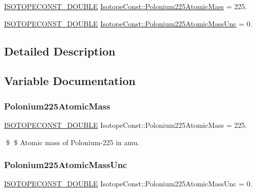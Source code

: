 \begin{DoxyCompactItemize}
\item 
\mbox{\hyperlink{group___isotope_const-_macros_ga8f45a7272ce02c0b4c65c44636ed719a}{I\+S\+O\+T\+O\+P\+E\+C\+O\+N\+S\+T\+\_\+\+D\+O\+U\+B\+LE}} \mbox{\hyperlink{group___isotope_const-_polonium-_po225_gaeb73050d9148f5de2b541ce38e450e15}{Isotope\+Const\+::\+Polonium225\+Atomic\+Mass}} = 225.
\item 
\mbox{\hyperlink{group___isotope_const-_macros_ga8f45a7272ce02c0b4c65c44636ed719a}{I\+S\+O\+T\+O\+P\+E\+C\+O\+N\+S\+T\+\_\+\+D\+O\+U\+B\+LE}} \mbox{\hyperlink{group___isotope_const-_polonium-_po225_ga4332cfda6e1617f4508d37139809e81b}{Isotope\+Const\+::\+Polonium225\+Atomic\+Mass\+Unc}} = 0.
\end{DoxyCompactItemize}


\subsection{Detailed Description}


\subsection{Variable Documentation}
\mbox{\label{group___isotope_const-_polonium-_po225_gaeb73050d9148f5de2b541ce38e450e15}} 
\subsubsection{\texorpdfstring{Polonium225\+Atomic\+Mass}{Polonium225AtomicMass}}
{\footnotesize\ttfamily \mbox{\hyperlink{group___isotope_const-_macros_ga8f45a7272ce02c0b4c65c44636ed719a}{I\+S\+O\+T\+O\+P\+E\+C\+O\+N\+S\+T\+\_\+\+D\+O\+U\+B\+LE}} Isotope\+Const\+::\+Polonium225\+Atomic\+Mass = 225.}

\$ \$ Atomic mass of Polonium-\/225 in amu. \mbox{\label{group___isotope_const-_polonium-_po225_ga4332cfda6e1617f4508d37139809e81b}} 
\subsubsection{\texorpdfstring{Polonium225\+Atomic\+Mass\+Unc}{Polonium225AtomicMassUnc}}
{\footnotesize\ttfamily \mbox{\hyperlink{group___isotope_const-_macros_ga8f45a7272ce02c0b4c65c44636ed719a}{I\+S\+O\+T\+O\+P\+E\+C\+O\+N\+S\+T\+\_\+\+D\+O\+U\+B\+LE}} Isotope\+Const\+::\+Polonium225\+Atomic\+Mass\+Unc = 0.}

